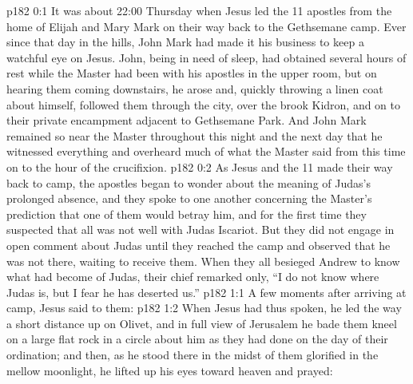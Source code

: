 \author{Midwayer Commission}
\vs p182 0:1 It was about 22:00 Thursday when Jesus led the 11 apostles from the home of Elijah and Mary Mark on their way back to the Gethsemane camp. Ever since that day in the hills, John Mark had made it his business to keep a watchful eye on Jesus. John, being in need of sleep, had obtained several hours of rest while the Master had been with his apostles in the upper room, but on hearing them coming downstairs, he arose and, quickly throwing a linen coat about himself, followed them through the city, over the brook Kidron, and on to their private encampment adjacent to Gethsemane Park. And John Mark remained so near the Master throughout this night and the next day that he witnessed everything and overheard much of what the Master said from this time on to the hour of the crucifixion.
\vs p182 0:2 As Jesus and the 11 made their way back to camp, the apostles began to wonder about the meaning of Judas’s prolonged absence, and they spoke to one another concerning the Master’s prediction that one of them would betray him, and for the first time they suspected that all was not well with Judas Iscariot. But they did not engage in open comment about Judas until they reached the camp and observed that he was not there, waiting to receive them. When they all besieged Andrew to know what had become of Judas, their chief remarked only, “I do not know where Judas is, but I fear he has deserted us.”
\vs p182 1:1 A few moments after arriving at camp, Jesus said to them: 
\vs p182 1:2 When Jesus had thus spoken, he led the way a short distance up on Olivet, and in full view of Jerusalem he bade them kneel on a large flat rock in a circle about him as they had done on the day of their ordination; and then, as he stood there in the midst of them glorified in the mellow moonlight, he lifted up his eyes toward heaven and prayed:
